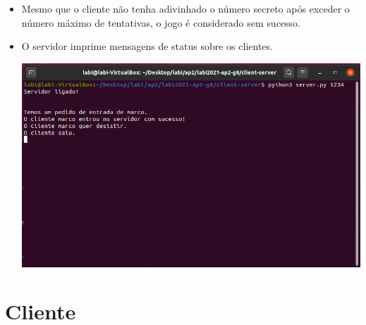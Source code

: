 \documentclass{report}
\begin{document}
\begin{itemize}
\begin{center}
        \end{center}
    \item Mesmo que o cliente não tenha adivinhado o número secreto após exceder o número máximo de tentativas, o jogo é considerado sem sucesso.
    \item O servidor imprime mensagens de status sobre os clientes.
        \begin{center}
            \includegraphics[scale = 0.58]{Imagens/server2.png}
        \end{center}
\end{itemize}

\chapter{Cliente}
\label{chap.cliente}
\end{document}

